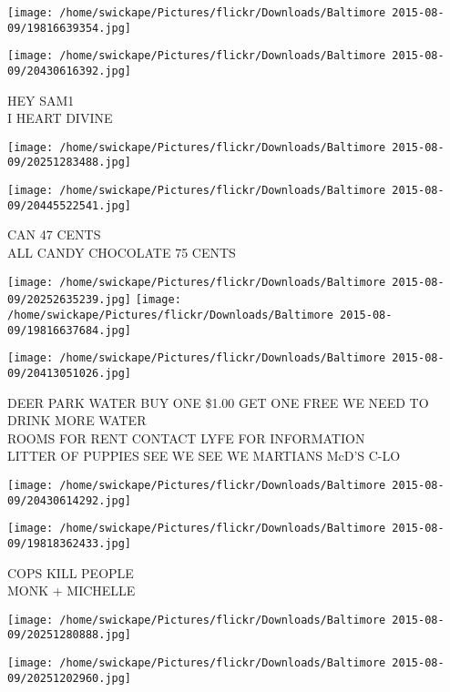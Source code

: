\documentclass[10pt,letterpaper]{article}
\begin{document}
\texttt{[image: /home/swickape/Pictures/flickr/Downloads/Baltimore 2015-08-09/19816639354.jpg]}

\vspace{0.25in}
\texttt{[image: /home/swickape/Pictures/flickr/Downloads/Baltimore 2015-08-09/20430616392.jpg]}

HEY SAM1\\
I HEART DIVINE\\
\pagebreak

\texttt{[image: /home/swickape/Pictures/flickr/Downloads/Baltimore 2015-08-09/20251283488.jpg]}

\vspace{0.25in}
\texttt{[image: /home/swickape/Pictures/flickr/Downloads/Baltimore 2015-08-09/20445522541.jpg]}

CAN 47 CENTS\\
ALL CANDY CHOCOLATE 75 CENTS\\
\pagebreak

\texttt{[image: /home/swickape/Pictures/flickr/Downloads/Baltimore 2015-08-09/20252635239.jpg]}
\texttt{[image: /home/swickape/Pictures/flickr/Downloads/Baltimore 2015-08-09/19816637684.jpg]}

\texttt{[image: /home/swickape/Pictures/flickr/Downloads/Baltimore 2015-08-09/20413051026.jpg]}

DEER PARK WATER BUY ONE \$1.00 GET ONE FREE WE NEED TO DRINK MORE WATER\\
ROOMS FOR RENT CONTACT LYFE FOR INFORMATION\\
LITTER OF PUPPIES SEE WE SEE WE MARTIANS McD'S C{-}LO\\
\pagebreak

\texttt{[image: /home/swickape/Pictures/flickr/Downloads/Baltimore 2015-08-09/20430614292.jpg]}

\vspace{0.25in}
\texttt{[image: /home/swickape/Pictures/flickr/Downloads/Baltimore 2015-08-09/19818362433.jpg]}

COPS KILL PEOPLE\\
MONK + MICHELLE\\
\pagebreak

\texttt{[image: /home/swickape/Pictures/flickr/Downloads/Baltimore 2015-08-09/20251280888.jpg]}

\vspace{0.25in}
\texttt{[image: /home/swickape/Pictures/flickr/Downloads/Baltimore 2015-08-09/20251202960.jpg]}
\end{document}
